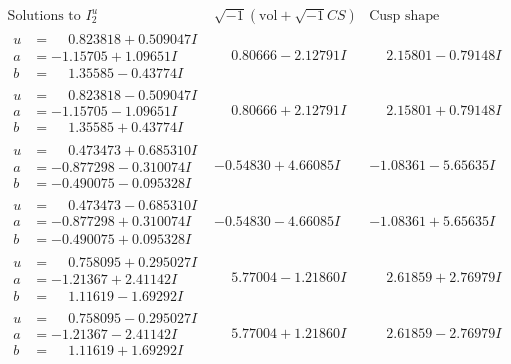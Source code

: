 \documentclass[1p]{elsarticle_modified}
\theoremstyle{definition}
\newcommand{\I}{\sqrt{-1}}
\begin{document}
$$\begin{array}{c|c|c}  
\text{Solutions to }I^u_{2}& \I (\text{vol} + \sqrt{-1}CS) & \text{Cusp shape}\\
 \hline 
\begin{aligned}
u &= \phantom{-}0.823818 + 0.509047 I \\
a &= -1.15705 + 1.09651 I \\
b &= \phantom{-}1.35585 - 0.43774 I\end{aligned}
 & \phantom{-}0.80666 - 2.12791 I & \phantom{-}2.15801 - 0.79148 I \\ \hline\begin{aligned}
u &= \phantom{-}0.823818 - 0.509047 I \\
a &= -1.15705 - 1.09651 I \\
b &= \phantom{-}1.35585 + 0.43774 I\end{aligned}
 & \phantom{-}0.80666 + 2.12791 I & \phantom{-}2.15801 + 0.79148 I \\ \hline\begin{aligned}
u &= \phantom{-}0.473473 + 0.685310 I \\
a &= -0.877298 - 0.310074 I \\
b &= -0.490075 - 0.095328 I\end{aligned}
 & -0.54830 + 4.66085 I & -1.08361 - 5.65635 I \\ \hline\begin{aligned}
u &= \phantom{-}0.473473 - 0.685310 I \\
a &= -0.877298 + 0.310074 I \\
b &= -0.490075 + 0.095328 I\end{aligned}
 & -0.54830 - 4.66085 I & -1.08361 + 5.65635 I \\ \hline\begin{aligned}
u &= \phantom{-}0.758095 + 0.295027 I \\
a &= -1.21367 + 2.41142 I \\
b &= \phantom{-}1.11619 - 1.69292 I\end{aligned}
 & \phantom{-}5.77004 - 1.21860 I & \phantom{-}2.61859 + 2.76979 I \\ \hline\begin{aligned}
u &= \phantom{-}0.758095 - 0.295027 I \\
a &= -1.21367 - 2.41142 I \\
b &= \phantom{-}1.11619 + 1.69292 I\end{aligned}
 & \phantom{-}5.77004 + 1.21860 I & \phantom{-}2.61859 - 2.76979 I \\ \hline\begin{aligned}

\end{aligned}
\end{array}$$
\end{document}
